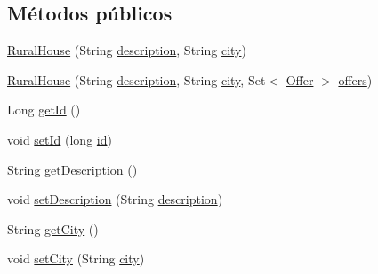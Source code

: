 \subsection*{Métodos públicos}
\begin{DoxyCompactItemize}
\item 
\mbox{\hyperlink{classcom_1_1ruralhousejsf_1_1domain_1_1_rural_house_aa3488a4d0e876307f91f80784a5538a5}{Rural\+House}} (String \mbox{\hyperlink{classcom_1_1ruralhousejsf_1_1domain_1_1_rural_house_a3cd460d3df936008a7c7580e87680fd4}{description}}, String \mbox{\hyperlink{classcom_1_1ruralhousejsf_1_1domain_1_1_rural_house_a495797ff9bd294c83563790e36ec2245}{city}})
\item 
\mbox{\hyperlink{classcom_1_1ruralhousejsf_1_1domain_1_1_rural_house_a7a4e2da81d0c806e058f446b4c657458}{Rural\+House}} (String \mbox{\hyperlink{classcom_1_1ruralhousejsf_1_1domain_1_1_rural_house_a3cd460d3df936008a7c7580e87680fd4}{description}}, String \mbox{\hyperlink{classcom_1_1ruralhousejsf_1_1domain_1_1_rural_house_a495797ff9bd294c83563790e36ec2245}{city}}, Set$<$ \mbox{\hyperlink{classcom_1_1ruralhousejsf_1_1domain_1_1_offer}{Offer}} $>$ \mbox{\hyperlink{classcom_1_1ruralhousejsf_1_1domain_1_1_rural_house_a8e07bbd638166d5d9356828a4ce09488}{offers}})
\item 
Long \mbox{\hyperlink{classcom_1_1ruralhousejsf_1_1domain_1_1_rural_house_adae53723eac123b55f8122e89cdfe9c3}{get\+Id}} ()
\item 
void \mbox{\hyperlink{classcom_1_1ruralhousejsf_1_1domain_1_1_rural_house_aaea8ea8cb5cb886fb0b7e38bb7546472}{set\+Id}} (long \mbox{\hyperlink{classcom_1_1ruralhousejsf_1_1domain_1_1_rural_house_ad9352e84ead5c4feb7eadee60570d9de}{id}})
\item 
String \mbox{\hyperlink{classcom_1_1ruralhousejsf_1_1domain_1_1_rural_house_a3d4f77d4ff2e8ca9527bb86816dc1174}{get\+Description}} ()
\item 
void \mbox{\hyperlink{classcom_1_1ruralhousejsf_1_1domain_1_1_rural_house_ad4e39275d6996833e089c2013bfb9c4b}{set\+Description}} (String \mbox{\hyperlink{classcom_1_1ruralhousejsf_1_1domain_1_1_rural_house_a3cd460d3df936008a7c7580e87680fd4}{description}})
\item 
String \mbox{\hyperlink{classcom_1_1ruralhousejsf_1_1domain_1_1_rural_house_acb17324965fdc86c270d1b2dc7624083}{get\+City}} ()
\item 
void \mbox{\hyperlink{classcom_1_1ruralhousejsf_1_1domain_1_1_rural_house_a329be3e41ca6f9e57a0fc887c066ad55}{set\+City}} (String \mbox{\hyperlink{classcom_1_1ruralhousejsf_1_1domain_1_1_rural_house_a495797ff9bd294c83563790e36ec2245}{city}})

\end{DoxyCompactItemize}
